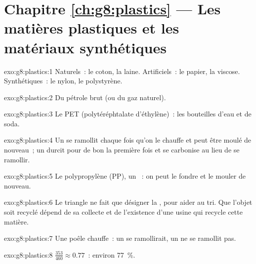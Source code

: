 \section*{Chapitre \ref{ch:g8:plastics} --- Les matières plastiques et les matériaux synthétiques}

\begin{solution}{exo:g8:plastics:1}
Naturels~: le coton, la laine. Artificiels~: le papier, la viscose.
Synthétiques~: le nylon, le polystyrène.
\end{solution}

\begin{solution}{exo:g8:plastics:2}
Du pétrole brut (ou du gaz naturel).
\end{solution}

\begin{solution}{exo:g8:plastics:3}
Le PET (polytéréphtalate d'éthylène)~: les bouteilles d'eau et de soda.
\end{solution}

\begin{solution}{exo:g8:plastics:4}
Un  se ramollit chaque fois qu'on le chauffe et peut être
moulé de nouveau~; un  durcit pour de bon la première
fois et se carbonise au lieu de se ramollir.
\end{solution}

\begin{solution}{exo:g8:plastics:5}
Le polypropylène (PP), un ~: on peut le fondre et le
mouler de nouveau.
\end{solution}

\begin{solution}{exo:g8:plastics:6}
Le triangle ne fait que désigner la , pour aider au
tri. Que l'objet soit recyclé dépend de sa collecte et de l'existence
d'une usine qui recycle cette matière.
\end{solution}

\begin{solution}{exo:g8:plastics:7}
Une poêle chauffe~: un  se ramollirait, un
 ne se ramollit pas.
\end{solution}

\begin{solution}{exo:g8:plastics:8}
$\frac{353}{460} \approx 0.77$~: environ \qty{77}{\percent}.
\end{solution}

